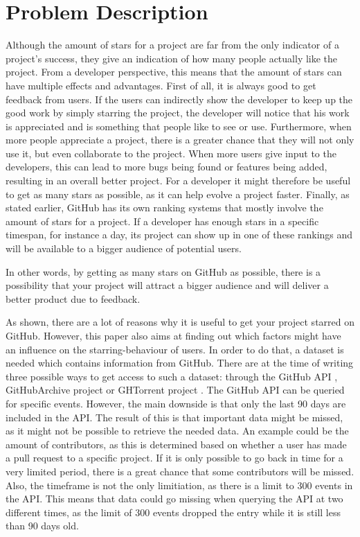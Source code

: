 \section{Problem Description}
    Although the amount of stars for a project are far from the only indicator of a project's success, they give an indication of how many people actually like the project.
    From a developer perspective, this means that the amount of stars can have multiple effects and advantages.
    First of all, it is always good to get feedback from users.
    If the users can indirectly show the developer to keep up the good work by simply starring the project, the developer will notice that his work is appreciated and is something that people like to see or use.
    Furthermore, when more people appreciate a project, there is a greater chance that they will not only use it, but even collaborate to the project.
    When more users give input to the developers, this can lead to more bugs being found or features being added, resulting in an overall better project.
    For a developer it might therefore be useful to get as many stars as possible, as it can help evolve a project faster.
    Finally, as stated earlier, GitHub has its own ranking systems that mostly involve the amount of stars for a project.
    If a developer has enough stars in a specific timespan, for instance a day, its project can show up in one of these rankings and will be available to a bigger audience of potential users.

    In other words, by getting as many stars on GitHub as possible, there is a possibility that your project will attract a bigger audience and will deliver a better product due to feedback.



    As shown, there are a lot of reasons why it is useful to get your project starred on GitHub.
    However, this paper also aims at finding out which factors might have an influence on the starring-behaviour of users.
    In order to do that, a dataset is needed which contains information from GitHub.
    There are at the time of writing three possible ways to get access to such a dataset: through the GitHub API \cite{TODO}, GitHubArchive project \cite{TODO} or GHTorrent project \cite{TODO}.
    The GitHub API can be queried for specific events.
    However, the main downside is that only the last 90 days are included in the API.
    The result of this is that important data might be missed, as it might not be possible to retrieve the needed data.
    An example could be the amount of contributors, as this is determined based on whether a user has made a pull request to a specific project.
    If it is only possible to go back in time for a very limited period, there is a great chance that some contributors will be missed.
    Also, the timeframe is not the only limitiation, as there is a limit to 300 events in the API.
    This means that data could go missing when querying the API at two different times, as the limit of 300 events dropped the entry while it is still less than 90 days old.

